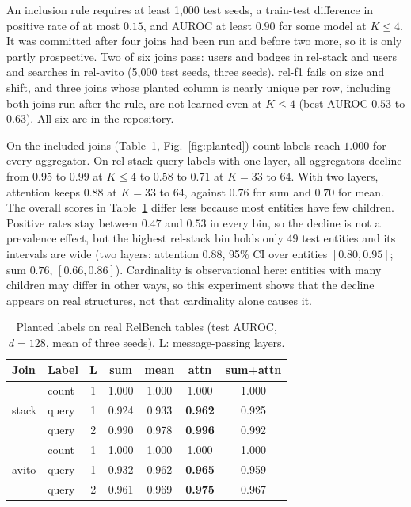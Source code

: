 \documentclass[conference]{IEEEtran}
\begin{document}
An inclusion rule requires at least 1{,}000 test seeds, a train-test difference in positive rate of at most $0.15$, and AUROC at least $0.90$ for some model at $K \le 4$. It was committed after four joins had been run and before two more, so it is only partly prospective. Two of six joins pass: users and badges in rel-stack and users and searches in rel-avito (5{,}000 test seeds, three seeds). rel-f1 fails on size and shift, and three joins whose planted column is nearly unique per row, including both joins run after the rule, are not learned even at $K \le 4$ (best AUROC $0.53$ to $0.63$). All six are in the repository.

On the included joins (Table~\ref{tab:planted}, Fig.~\ref{fig:planted}) count labels reach $1.000$ for every aggregator. On rel-stack query labels with one layer, all aggregators decline from $0.95$ to $0.99$ at $K \le 4$ to $0.58$ to $0.71$ at $K = 33$ to $64$. With two layers, attention keeps $0.88$ at $K = 33$ to $64$, against $0.76$ for sum and $0.70$ for mean. The overall scores in Table~\ref{tab:planted} differ less because most entities have few children. Positive rates stay between $0.47$ and $0.53$ in every bin, so the decline is not a prevalence effect, but the highest rel-stack bin holds only 49 test entities and its intervals are wide (two layers: attention $0.88$, 95\% CI over entities $[0.80, 0.95]$; sum $0.76$, $[0.66, 0.86]$). Cardinality is observational here: entities with many children may differ in other ways, so this experiment shows that the decline appears on real structures, not that cardinality alone causes it.

\begin{table}[t]
\caption{Planted labels on real RelBench tables (test AUROC, $d = 128$, mean of three seeds). L: message-passing layers.}
\label{tab:planted}
\centering
\setlength{\tabcolsep}{3.5pt}
\begin{tabular}{llccccc}
\toprule
Join & Label & L & sum & mean & attn & sum+attn\\
\midrule
\multirow{3}{*}{stack} & count & 1 & 1.000 & 1.000 & 1.000 & 1.000\\
& query & 1 & 0.924 & 0.933 & \textbf{0.962} & 0.925\\
& query & 2 & 0.990 & 0.978 & \textbf{0.996} & 0.992\\
\midrule
\multirow{3}{*}{avito} & count & 1 & 1.000 & 1.000 & 1.000 & 1.000\\
& query & 1 & 0.932 & 0.962 & \textbf{0.965} & 0.959\\
& query & 2 & 0.961 & 0.969 & \textbf{0.975} & 0.967\\
\bottomrule
\end{tabular}
\end{table}
\end{document}
